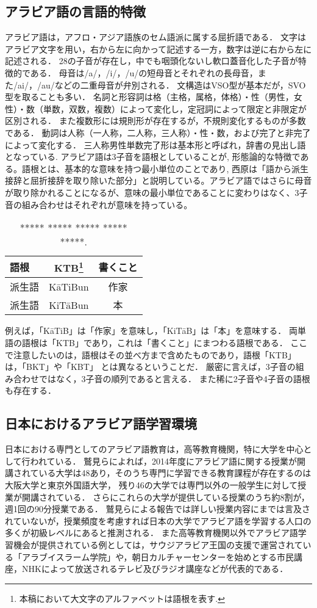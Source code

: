 \documentclass[technicalreport]{ieicej}
\begin{document}
\subsection{アラビア語の言語的特徴}
アラビア語は，アフロ・アジア語族のセム語派に属する屈折語である．
文字はアラビア文字を用い，右から左に向かって記述する一方，数字は逆に右から左に記述される．
28の子音が存在し，中でも咽頭化ないし軟口蓋音化した子音が特徴的である．
母音は/a/，/i/，/u/の短母音とそれぞれの長母音，また/ai/，/au/などの二重母音が弁別される．
文構造はVSO型が基本だが，SVO型を取ることも多い．
名詞と形容詞は格（主格，属格，体格）・性（男性，女性）・数（単数，双数，複数）によって変化し，定冠詞によって限定と非限定が区別される．
また複数形には規則形が存在するが，不規則変化するものが多数である．
動詞は人称（一人称，二人称，三人称）・性・数，および完了と非完了によって変化する．
三人称男性単数完了形は基本形と呼ばれ，辞書の見出し語となっている.
アラビア語は3子音を語根としていることが, 形態論的な特徴である。語根とは、基本的な意味を持つ最小単位のことであり, 西原は「語から派生接辞と屈折接辞を取り除いた部分」と説明している。アラビア語ではさらに母音が取り除かれることになるが、意味の最小単位であることに変わりはなく、3子音の組み合わせはそれぞれが意味を持っている。
\begin{table}[ht]
\begin{center}
\begin{tabular}{l|cc}
   語根& KTB\footnote{本稿において大文字のアルファベットは語根を表す.} & 書くこと\\
  \hline
 派生語& KāTiBun & 作家\\
  派生語& KiTāBun & 本\\
\hline
\end{tabular}
\caption{***** ***** ***** ***** *****.}
\label{table:alignment}
\end{center}
\end{table}
例えば，「KāTiB」は「作家」を意味し，「KiTāB」は「本」を意味する．
両単語の語根は「KTB」であり，これは「書くこと」にまつわる語根である．
ここで注意したいのは，語根はその並べ方まで含めたものであり，語根「KTB」は，「BKT」や「KBT」 とは異なるということだ．
厳密に言えば，3子音の組み合わせではなく，3子音の順列であると言える．
また稀に2子音や4子音の語根も存在する．

\subsection{日本におけるアラビア語学習環境}
日本における専門としてのアラビア語教育は，高等教育機関，特に大学を中心として行われている．
鷲見らによれば，2014年度にアラビア語に関する授業が開講されている大学は48あり，そのうち専門に学習できる教育課程が存在するのは大阪大学と東京外国語大学， 残り46の大学では専門以外の一般学生に対して授業が開講されている．
さらにこれらの大学が提供している授業のうち約8割が，週1回の90分授業である．
鷲見らによる報告では詳しい授業内容にまでは言及されていないが，授業頻度を考慮すれば日本の大学でアラビア語を学習する人口の多くが初級レベルにあると推測される．
また高等教育機関以外でアラビア語学習機会が提供されている例としては，サウジアラビア王国の支援で運営されている「アラブイスラーム学院」や，朝日カルチャーセンターを始めとする市民講座，NHKによって放送されるテレビ及びラジオ講座などが代表的である．
\end{document}
